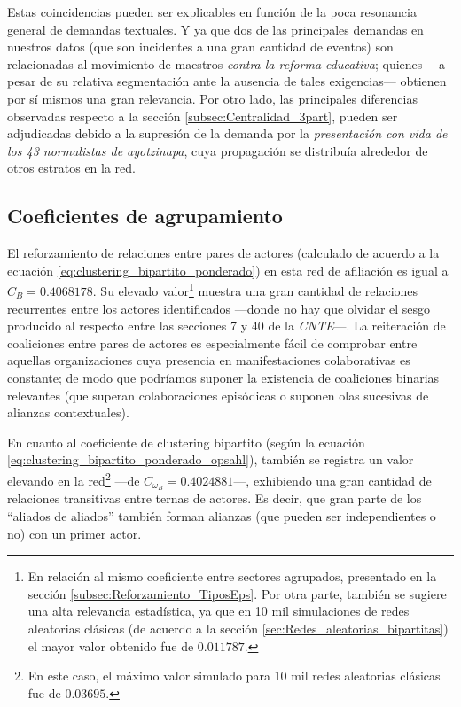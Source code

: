 \documentclass[letterpaper, 11pt]{book}
\theoremstyle{definition}
\theoremstyle{remark}
\begin{document}
Estas coincidencias pueden ser explicables en función de la poca resonancia general de demandas textuales. 
Y ya que dos de las principales demandas en nuestros datos (que son incidentes a una gran cantidad de eventos) son relacionadas al movimiento de maestros \emph{contra la reforma educativa}; quienes ---a pesar de su relativa segmentación ante la ausencia de tales exigencias--- obtienen por sí mismos una gran relevancia. 
Por otro lado, las principales diferencias observadas respecto a la sección \ref{subsec:Centralidad_3part}, pueden ser adjudicadas debido a la supresión de la demanda por la \emph{presentación  con vida de los 43 normalistas de ayotzinapa}, cuya propagación se distribuía alrededor de otros estratos en la red. 



\subsection{Coeficientes de agrupamiento}
\label{subsec:coeficientesAgrup_afiliacion}

El reforzamiento de relaciones entre pares de actores (calculado de acuerdo a la ecuación \ref{eq:clustering_bipartito_ponderado}) en esta red de afiliación es igual a $C_{B} = 0.4068178$. 
Su elevado valor\footnote{
    En relación al mismo coeficiente entre sectores agrupados, presentado en la sección \ref{subsec:Reforzamiento_TiposEps}. 
    Por otra parte, también se sugiere una alta relevancia estadística, ya que en 10 mil simulaciones de redes aleatorias clásicas (de acuerdo a la sección \ref{sec:Redes_aleatorias_bipartitas}) el mayor valor obtenido fue de $0.011787$. 
} 
muestra una gran cantidad de relaciones recurrentes entre los actores identificados ---donde no hay que olvidar el sesgo producido al respecto entre las secciones 7 y 40 de la \emph{CNTE}---. 
La reiteración de coaliciones entre pares de actores es especialmente fácil de comprobar entre aquellas organizaciones cuya presencia en manifestaciones colaborativas es constante; de modo que podríamos suponer la existencia de coaliciones binarias relevantes (que superan colaboraciones episódicas o suponen olas sucesivas de alianzas contextuales). 


En cuanto al coeficiente de clustering bipartito (según la ecuación \ref{eq:clustering_bipartito_ponderado_opsahl}), también se registra un valor elevando en la red\footnote{
    En este caso, el máximo valor simulado para 10 mil redes aleatorias clásicas fue de $0.03695$. 
} ---de $C_{\omega_B} = 0.4024881$---, 
exhibiendo una gran cantidad de relaciones transitivas entre ternas de actores. 
Es decir, que gran parte de los ``aliados de aliados'' también forman alianzas (que pueden ser independientes o no) con un primer actor. 
\end{document}
